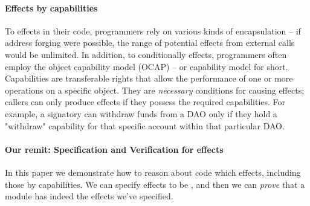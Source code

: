 \paragraph{Effects \tamed by capabilities} 
To \tame  effects  in their code, 
programmers    rely on various kinds of  encapsulation -- \eg if address forging were possible, the range of potential effects from external calls would be unlimited.
In addition, to conditionally \tame effects, programmers often 
employ  the object capability model (OCAP)\cite{MillerPhD} --
 or capability model for short. 
Capabilities are transferable rights that allow the performance of one or more operations on a specific object. 
They are {\emph{necessary}} conditions for causing effects; callers can only produce effects if they possess the required capabilities. 
For example, a signatory can withdraw funds from a DAO only if they hold a "withdraw" capability for that specific account within that particular DAO.  



\paragraph{Our remit:  Specification and Verification for  \tamed effects}
In this paper we demonstrate how to reason about  code which \tames effects,
{including those \tamed by capabilities.}  
We can specify effects to be \tamed, 
and then we can \emph{prove} that a module has indeed \tamed the effects we've specified.

